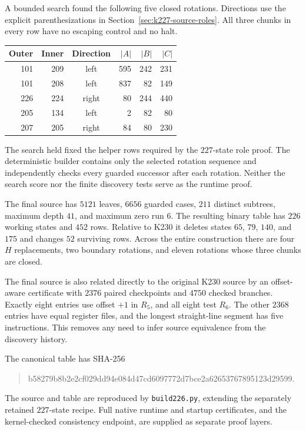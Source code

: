 A bounded search found the following five closed rotations.  Directions
use the explicit parenthesizations in Section~\ref{sec:k227-source-roles}.
All three chunks in every row have no escaping control and no halt.
\begin{center}
\begin{tabular}{r r c r r r}
Outer & Inner & Direction & $|A|$ & $|B|$ & $|C|$\\
\hline
101 & 209 & left  & 595 & 242 & 231\\
101 & 208 & left  & 837 & 82 & 149\\
226 & 224 & right & 80 & 244 & 440\\
205 & 134 & left  & 2 & 82 & 80\\
207 & 205 & right & 84 & 80 & 230
\end{tabular}
\end{center}

The search held fixed the helper rows required by the $227$-state role
proof.  The deterministic builder contains only the selected rotation
sequence and independently checks every guarded successor after each
rotation.  Neither the search score nor the finite discovery tests
serve as the runtime proof.

The final source has $5121$ leaves, $6656$ guarded cases, $211$ distinct
subtrees, maximum depth $41$, and maximum zero run $6$.
The resulting binary table has $226$ working states and $452$ rows.
Relative to K230 it deletes states $65$, $79$, $140$, and $175$ and
changes $52$ surviving rows.  Across the entire construction there are
four $H$ replacements, two boundary rotations, and eleven rotations
whose three chunks are closed.

The final source is also related directly to the original K230 source
by an offset-aware certificate with $2376$ paired checkpoints and
$4750$ checked branches.  Exactly eight entries use offset $+1$ in
$R_5$, and all eight test $R_6$.  The other $2368$ entries have equal
register files, and the longest straight-line segment has five
instructions.  This removes any need to infer source equivalence from
the discovery history.

The canonical table has SHA-256
\begin{quote}\ttfamily\small
b58279b8b2e2cf029dd94e084d47cd6097772d7bce2a62653767895123d29599.
\end{quote}
The source and table are reproduced by \texttt{build226.py}, extending
the separately retained $227$-state recipe.  Full native runtime and
startup certificates, and the kernel-checked consistency endpoint,
are supplied as separate proof layers.
